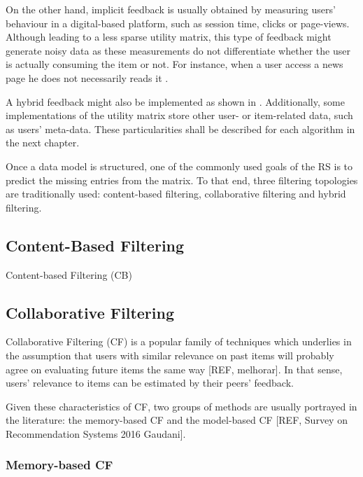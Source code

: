    On the other hand, implicit feedback is usually obtained by measuring users' behaviour in a digital-based platform, such as session time, clicks or page-views. Although leading to a less sparse utility matrix, this type of feedback might generate noisy data as these measurements do not differentiate whether the user is actually consuming the item or not. For instance, when a user access a news page he does not necessarily reads it \cite{2008ImplicitFeedback}.
    
    A hybrid feedback might also be implemented as shown in \cite{2015RSPrinciples}. Additionally, some implementations of the utility matrix store other user- or item-related data, such as users' meta-data. These particularities shall be described for each algorithm in the next chapter. 
    
    Once a data model is structured, one of the commonly used goals of the RS is to predict the missing entries from the matrix. To that end, three filtering topologies are traditionally used: content-based filtering, collaborative filtering and hybrid filtering. 

\subsection{Content-Based Filtering}

Content-based Filtering (CB) 

\subsection{Collaborative Filtering}
\label{sec:CF}

    Collaborative Filtering (CF)  is a popular family of techniques which underlies in the assumption 
    that users with similar relevance on past items will probably agree on evaluating future items 
    the same way [REF, melhorar]. In that sense, users' relevance to items can be estimated by their
    peers' feedback.

    Given these characteristics of CF, two groups of methods are usually portrayed in the literature: 
    the memory-based CF and the model-based CF [REF, Survey on Recommendation Systems 2016 Gaudani]. 

  \subsubsection{Memory-based CF}

